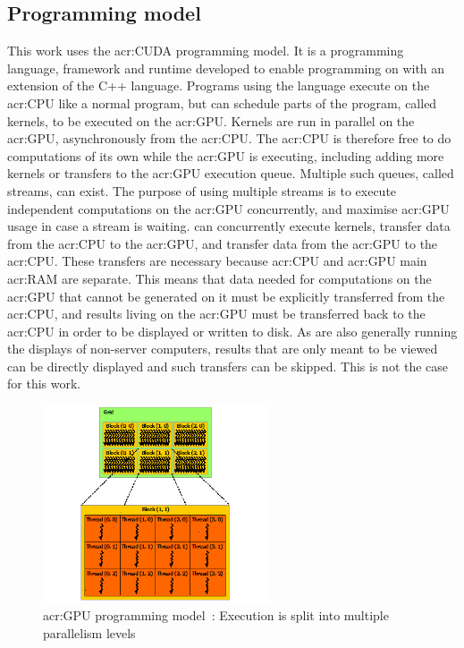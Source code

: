\subsection{Programming model}\label{subsection:graphics_processing_units:architecture:programming_model}

This work uses the \acrshort{acr:CUDA} programming model. It is a programming language, framework
and runtime developed to enable programming on  with an extension of the C++
language. Programs using the language execute on the \acrshort{acr:CPU} like a normal program, but
can schedule parts of the program, called kernels, to be executed on the \acrshort{acr:GPU}. Kernels
are run in parallel on the \acrshort{acr:GPU}, asynchronously from the \acrshort{acr:CPU}. The
\acrshort{acr:CPU} is therefore free to do computations of its own while the \acrshort{acr:GPU} is
executing, including adding more kernels or transfers to the \acrshort{acr:GPU} execution queue.
Multiple such queues, called streams, can exist. The purpose of using multiple streams is to execute
independent computations on the \acrshort{acr:GPU} concurrently, and maximise \acrshort{acr:GPU}
usage in case a stream is waiting.  can concurrently execute kernels, transfer
data from the \acrshort{acr:CPU} to the \acrshort{acr:GPU}, and transfer data from the
\acrshort{acr:GPU} to the \acrshort{acr:CPU}. These transfers are necessary because
\acrshort{acr:CPU} and \acrshort{acr:GPU} main \acrlong{acr:RAM} are separate. This means that data
needed for computations on the \acrshort{acr:GPU} that cannot be generated on it must be explicitly
transferred from the \acrshort{acr:CPU}, and results living on the \acrshort{acr:GPU} must be
transferred back to the \acrshort{acr:CPU} in order to be displayed or written to disk. As
 are also generally running the displays of non-server computers, results that
are only meant to be viewed can be directly displayed and such transfers can be skipped. This is not
the case for this work. 

\begin{figure}[H]
	\centering
	\includegraphics[width=0.6\textwidth]{Chapter_graphics_processing_units/media/grid-of-thread-blocks}
	\caption{\Acrshort{acr:GPU} programming model~\cite{Nvidia2021}: Execution is split into multiple parallelism levels}\label{fig:gpu_programming_model}
\end{figure}

